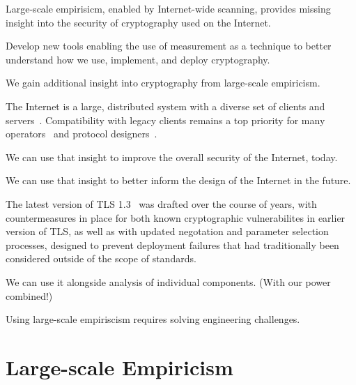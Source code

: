 
Large-scale empirisicm, enabled by Internet-wide scanning, provides missing
insight into the security of cryptography used on the Internet.

Develop new tools enabling the use of measurement as a technique to better understand how we use, implement, and deploy cryptography.


We gain additional insight into cryptography from large-scale empiricism.

The Internet is a large, distributed system with a diverse set of clients and
servers~\cite{something}. Compatibility with legacy clients remains a top priority 
for many operators~\cite{something} and protocol designers~\cite{something}.

%

We can use that insight to improve the overall security of the Internet, today.

We can use that insight to better inform the design of the Internet in the future.

The latest version of TLS 1.3~\cite{rfc8446} was drafted over the course of \TK years, with countermeasures
in place for both known cryptographic vulnerabilites in earlier version of TLS, as well as with updated negotation and parameter selection processes, designed to prevent deployment failures that had traditionally been considered outside of the scope of standards.

We can use it alongside analysis of individual components. (With our power combined!)

Using large-scale empiriscism requires solving engineering challenges.

\section{Large-scale Empiricism}

% 
% 
% 
% 
% 
% 
% 

